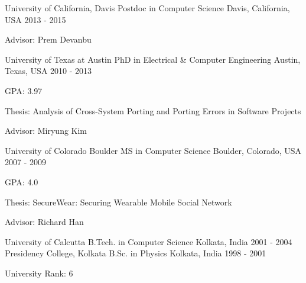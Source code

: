 
\begin{cventries}
    \cventry
    {University of California, Davis}
    {Postdoc in Computer Science}
    {Davis, California, USA}
    {2013 - 2015}
    {
      \begin{cvitems}
        \item {Advisor: Prem Devanbu}
      \end{cvitems}
    }
     \vspace{-4mm}
  \cventry
    {University of Texas at Austin}
    {PhD in Electrical \& Computer Engineering}
    {Austin, Texas, USA}
    {2010 - 2013}
    {
      \begin{cvitems}
        \item {GPA: 3.97}
        \item {Thesis: Analysis of Cross-System Porting and Porting Errors in Software Projects}
        \item {Advisor: Miryung Kim}
      \end{cvitems}
    }
     \vspace{-4mm}
    \cventry
    {University of Colorado Boulder}
    {MS in Computer Science}
    {Boulder, Colorado, USA}
    {2007 - 2009}
    {
      \begin{cvitems}
        \item {GPA: 4.0}
        \item {Thesis: SecureWear: Securing Wearable Mobile Social Network}
        \item {Advisor: Richard Han}
      \end{cvitems}
    }
    \vspace{-4mm}
    \cventry
    {University of Calcutta}
    {B.Tech. in Computer Science}
    {Kolkata, India}
    {2001 - 2004}
    {
    }
    \vspace{-4mm}
    \cventry
    {Presidency College, Kolkata}
    {B.Sc. in Physics}
    {Kolkata, India}
    {1998 - 2001}
    {
      \begin{cvitems}
        \item {University Rank: 6}
      \end{cvitems}
    }
\end{cventries}
